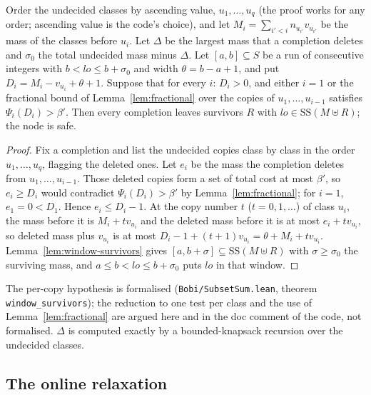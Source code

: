 \begin{proposition}\label{prop:window-rule}
Order the undecided classes by ascending value, $u_1,\dots,u_q$ (the proof
works for any order; ascending value is the code's choice), and let
$M_i=\sum_{i'<i}n_{u_{i'}}v_{u_{i'}}$ be the mass of the classes before $u_i$.
Let $\Delta$ be the largest mass that a completion deletes and $\sigma_0$ the
total undecided mass minus $\Delta$. Let $[a,b]\subseteq S$ be a run of
consecutive integers with $b<lo\le b+\sigma_0$ and width $\theta=b-a+1$, and
put $D_i=M_i-v_{u_i}+\theta+1$. Suppose that for every $i$: $D_i>0$, and either
$i=1$ or the fractional bound of Lemma~\ref{lem:fractional} over the copies
of $u_1,\dots,u_{i-1}$ satisfies $\Psi_i(D_i)>\beta'$. Then every completion
leaves survivors $R$ with $lo\in\mathrm{SS}(M\uplus R)$; the node is safe.
\end{proposition}
\begin{proof}
Fix a completion and list the undecided copies class by class in the order
$u_1,\dots,u_q$, flagging the deleted ones. Let $e_i$ be the mass the completion
deletes from $u_1,\dots,u_{i-1}$. Those deleted copies form a set of total cost
at most $\beta'$, so $e_i\ge D_i$ would contradict $\Psi_i(D_i)>\beta'$ by
Lemma~\ref{lem:fractional}; for $i=1$, $e_1=0<D_1$. Hence $e_i\le D_i-1$. At
the copy number $t$ ($t=0,1,\dots$) of class $u_i$, the mass before it is
$M_i+tv_{u_i}$ and the deleted mass before it is at most $e_i+tv_{u_i}$, so
deleted mass plus $v_{u_i}$ is at most
$D_i-1+(t+1)v_{u_i}=\theta+M_i+tv_{u_i}$. Lemma~\ref{lem:window-survivors}
gives $[a,b+\sigma]\subseteq\mathrm{SS}(M\uplus R)$ with $\sigma\ge\sigma_0$ the
surviving mass, and $a\le b<lo\le b+\sigma_0$ puts $lo$ in that window.
\end{proof}
{\raggedright\noindent The per-copy hypothesis is formalised
(\texttt{Bobi/SubsetSum.lean}, theorem \texttt{window\_survivors}); the
reduction to one test per class and the use of Lemma~\ref{lem:fractional} are
argued here and in the doc comment of the code, not formalised. $\Delta$ is
computed exactly by a bounded-knapsack recursion over the undecided classes.\par}

\subsection{The online relaxation}

